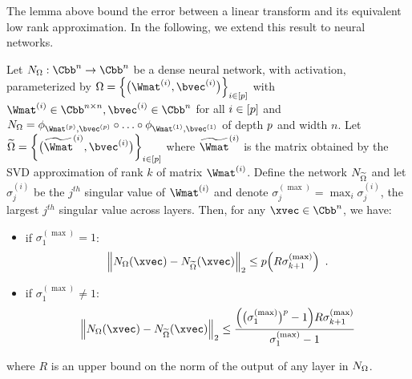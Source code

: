 The lemma above bound the error between a linear transform and its equivalent low rank approximation.
In the following, we extend this result to neural networks.


\begin{proposition} \label{proposition:ch4-approximation_network_dense_to_low_rank}
  Let $\nn_\Omega: \Cbb^n \rightarrow \Cbb^n$ be a dense neural network, with \relu activation, parameterized by $\Omega = \left\{ \big(\Wmat^{(i)},\bvec^{(i)} \big) \right\}_{i \in [\depth]}$ with $\Wmat^{(i)} \in \Cbb^{n \times n}, \bvec^{(i)} \in \Cbb^n$ for all $i \in [p]$ and $\nn_\Omega = \layer_{\Wmat^{(\depth)},\bvec^{(\depth)}} \circ \ldots \circ \layer_{\Wmat^{(1)},\bvec^{(1)}}$ of depth $p$ and width $n$.
  Let $\widetilde{\Omega} = \left\{ \big( \widetilde{\Wmat}^{(i)},\bvec^{(i)} \big) \right\}_{i \in [\depth]}$ where $\widetilde{\Wmat}^{(i)}$ is the matrix obtained by the SVD approximation of rank $k$ of matrix $\Wmat^{(i)}$. 
  Define the network $N_{\widetilde{\Omega}}$ and let $\sigma_{j}^{(i)}$ be the $j^{th}$ singular value of $\Wmat^{(i)}$ and denote $\sigma_j^{(\max)} = \max_i \sigma_j^{(i)}$, the largest $j^{th}$ singular value across layers.
  Then, for any $\xvec \in \Cbb^n$, we have:
  \begin{itemize}
    \item if $\sigma_{1}^{(\max)} = 1$:
      \begin{equation}
	\norm{ \nn_\Omega(\xvec) - \nn_{\widetilde{\Omega}}(\xvec)}_2 \le \depth \left(  R \sigma_{k+1}^{(\max)} \right) \enspace.
      \end{equation}
    \item if $\sigma_{1}^{(\max)} \neq 1$:
      \begin{equation}
	\norm{ \nn_\Omega(\xvec) - \nn_{\widetilde{\Omega}}(\xvec)}_2 \le \frac{\left( \big(\sigma_{1}^{(\max)}\big)^\depth - 1 \right) R \sigma_{k+1}^{(\max)}}{\sigma_{1}^{(\max)} - 1}
      \end{equation}
  \end{itemize}
  where $R$ is an upper bound on the norm of the output of any layer in $N_\Omega$.
\end{proposition}

